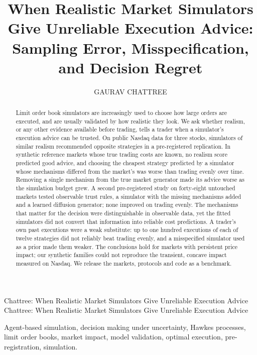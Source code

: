 \documentclass{ieeeaccess}
\begin{document}

\title{When Realistic Market Simulators Give Unreliable Execution Advice: Sampling Error, Misspecification, and Decision Regret}
\author{\uppercase{Gaurav Chattree}}
\address[1]{AFFILIATION, CITY, COUNTRY (e-mail: EMAIL)}

\markboth
{Chattree: When Realistic Market Simulators Give Unreliable Execution Advice}
{Chattree: When Realistic Market Simulators Give Unreliable Execution Advice}


\begin{abstract}
Limit order book simulators are increasingly used to choose how large orders are executed, and are usually validated
by how realistic they look. We ask whether realism, or any other evidence available
before trading, tells a trader when a simulator's execution advice can be trusted. On public Nasdaq data for three
stocks, simulators of similar realism recommended opposite strategies in a pre-registered replication. In synthetic
reference markets whose true trading costs are known, no realism score predicted good advice, and choosing the cheapest
strategy predicted by a simulator whose mechanisms differed from the market's was worse than trading evenly over time.
Removing a single mechanism from the true market generator made its advice worse as the simulation budget grew. A second
pre-registered study on forty-eight untouched markets tested observable trust rules, a simulator with the missing
mechanisms added and a learned diffusion generator; none improved on trading evenly. The mechanisms that matter for the decision were distinguishable in observable data, yet the
fitted simulators did not convert that information into reliable cost predictions. A trader's own past executions were
a weak substitute: up to one hundred executions of each of twelve strategies did not reliably beat trading evenly, and a
misspecified simulator used as a prior made them weaker. The conclusions hold for markets with persistent price impact;
our synthetic families could not reproduce the transient, concave impact measured on Nasdaq. We release the markets,
protocols and code as a benchmark.
\end{abstract}

\begin{keywords}
Agent-based simulation, decision making under uncertainty, Hawkes processes, limit order books, market impact, model
validation, optimal execution, pre-registration, simulation.
\end{keywords}
\end{document}
